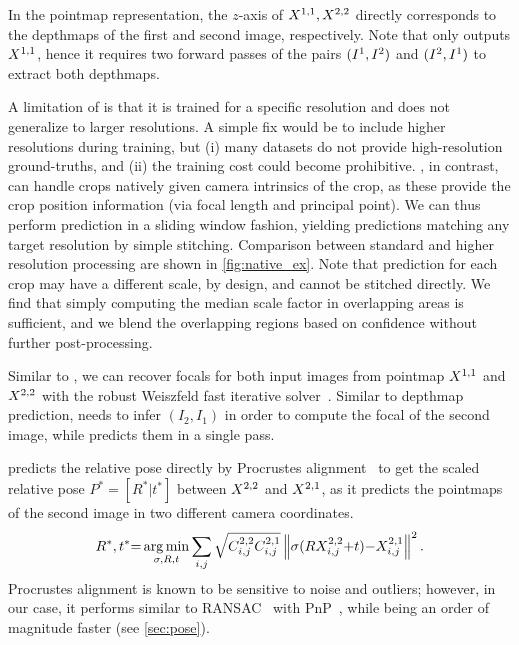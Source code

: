 In the pointmap representation, the $z$-axis of $X^{1,1},X^{2,2}$ directly corresponds to the depthmaps of the first and second image, respectively.
Note that \duster{} only outputs $X^{1,1}$, hence it requires two forward passes of the pairs $(I^{1}, I^{2})$ and $(I^{2}, I^{1})$ to extract both depthmaps.

A limitation of \duster{} is that it is trained for a specific resolution and does not generalize to larger resolutions.
A simple fix would be to include higher resolutions during training, but (i) many datasets do not provide high-resolution ground-truths, and (ii) the training cost could become prohibitive.
\ours{}, in contrast, can handle crops natively given camera intrinsics of the crop, as these provide the crop position information (\ie via focal length and principal point).
We can thus perform prediction in a sliding window fashion, yielding predictions matching any target resolution by simple stitching.
Comparison between standard and higher resolution processing are shown in \cref{fig:native_ex}.
Note that prediction for each crop may have a different scale, by design, and cannot be stitched directly.
We find that simply computing the median scale factor in overlapping areas is sufficient, and we blend the overlapping regions based on confidence without further post-processing.

Similar to \duster{}, we can recover focals for both input images from pointmap $X^{1,1}$ and $X^{2,2}$ with the robust Weiszfeld fast iterative solver~\cite{Plastria2011Weiszfeld}.
Similar to depthmap prediction, \duster{} needs to infer $(I_2,I_1)$ in order to compute the focal of the second image, while \ours{} predicts them in a single pass.

 \ours{} predicts the relative pose directly by  Procrustes alignment~\cite{Luo1999Procrustes, bregier2021deepregression} to get the scaled relative pose $P^{*}=[R^{*}|t^{*}]$ between $X^{2,2}$ and $X^{2,1}$, as it predicts the pointmaps of the second image in two different camera coordinates. 
{\small
\begin{equation}
   R^*, t^* {=} \operatorname*{arg\,min}_{\sigma,R,t} \sum_{i,j} \sqrt{C^{2,2}_{i,j} C^{2,1}_{i,j}} \left\Vert \sigma (R X^{2,2}_{i,j} {+} t) {-} X^{2,1}_{i,j} \right\Vert^2. 
\end{equation}}
\noindent Procrustes alignment is known to be sensitive to noise and outliers; however, in our case, it performs similar to RANSAC~\cite{Fischler1981RANSAC} with PnP~\cite{hartley2003multiple,Lepetit2009EPnP}, while being an order of magnitude faster (see \cref{sec:pose}).

